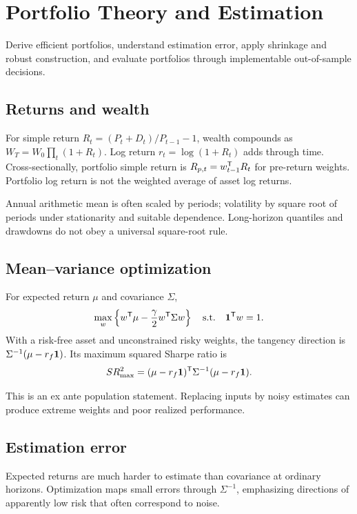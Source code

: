 \chapter{Portfolio Theory and Estimation}

\begin{objectives}
Derive efficient portfolios, understand estimation error, apply shrinkage and robust
construction, and evaluate portfolios through implementable out-of-sample decisions.
\end{objectives}

\section{Returns and wealth}

For simple return $R_t=(P_t+D_t)/P_{t-1}-1$, wealth compounds as
$W_T=W_0\prod_t(1+R_t)$. Log return $r_t=\log(1+R_t)$ adds through time.
Cross-sectionally, portfolio simple return is $R_{p,t}=w_{t-1}^\mathsf T R_t$ for
pre-return weights. Portfolio log return is not the weighted average of asset log
returns.

Annual arithmetic mean is often scaled by periods; volatility by square root of
periods under stationarity and suitable dependence. Long-horizon quantiles and
drawdowns do not obey a universal square-root rule.

\section{Mean--variance optimization}

For expected return $\mu$ and covariance $\Sigma$,
\[
\max_w\left\{w^\mathsf T\mu-\frac{\gamma}{2}w^\mathsf T\Sigma w\right\}
\quad\text{s.t.}\quad\bm 1^\mathsf T w=1.
\]
With a risk-free asset and unconstrained risky weights, the tangency direction is
$\Sigma^{-1}(\mu-r_f\bm 1)$. Its maximum squared Sharpe ratio is
\[
SR_{\max}^2=(\mu-r_f\bm 1)^\mathsf T
\Sigma^{-1}(\mu-r_f\bm 1).
\]

This is an ex ante population statement. Replacing inputs by noisy estimates can
produce extreme weights and poor realized performance.

\section{Estimation error}

Expected returns are much harder to estimate than covariance at ordinary horizons.
Optimization maps small errors through $\Sigma^{-1}$, emphasizing directions of
apparently low risk that often correspond to noise.


